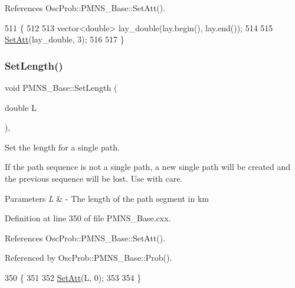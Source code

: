 References Osc\+Prob\+::\+P\+M\+N\+S\+\_\+\+Base\+::\+Set\+Att().


\begin{DoxyCode}
511                                            \{
512 
513   vector<double> lay\_double(lay.begin(), lay.end());
514 
515   \hyperlink{classOscProb_1_1PMNS__Base_aba565962a440d14bee7a2a96d2eca2c5}{SetAtt}(lay\_double, 3);
516 
517 \}
\end{DoxyCode}
\mbox{\label{classOscProb_1_1PMNS__Base_a6241325b1bd28cafa556daaecbe4ed62}} 
\subsubsection{\texorpdfstring{Set\+Length()}{SetLength()}\hspace{0.1cm}{\footnotesize\ttfamily [1/2]}}
{\footnotesize\ttfamily void P\+M\+N\+S\+\_\+\+Base\+::\+Set\+Length (\begin{DoxyParamCaption}\item[{double}]{L }\end{DoxyParamCaption})\hspace{0.3cm}{\ttfamily [virtual]}, {\ttfamily [inherited]}}

Set the length for a single path.

If the path sequence is not a single path, a new single path will be created and the previous sequence will be lost. Use with care.


\begin{DoxyParams}{Parameters}
{\em L} & -\/ The length of the path segment in km \\
\hline
\end{DoxyParams}


Definition at line 350 of file P\+M\+N\+S\+\_\+\+Base.\+cxx.



References Osc\+Prob\+::\+P\+M\+N\+S\+\_\+\+Base\+::\+Set\+Att().



Referenced by Osc\+Prob\+::\+P\+M\+N\+S\+\_\+\+Base\+::\+Prob().


\begin{DoxyCode}
350                                  \{
351 
352   \hyperlink{classOscProb_1_1PMNS__Base_aba565962a440d14bee7a2a96d2eca2c5}{SetAtt}(L, 0);
353 
354 \}
\end{DoxyCode}
\mbox{\label{classOscProb_1_1PMNS__Base_aa34a40a3b5abda0f252982d9ead3b520}} 
